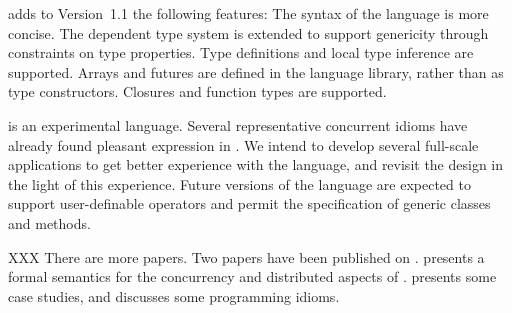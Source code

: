 {}\XtenCurrVer{} adds to Version~1.1 the following features:
The syntax of the language is more concise.
The dependent type system is extended to support genericity through
constraints on type properties.  Type definitions and local type inference are
supported.  Arrays and futures are defined in the language library, rather than
as type constructors.  Closures and function types are supported.

{}\Xten{} is an experimental language.  Several representative
concurrent idioms have already found pleasant expression in \Xten. We
intend to develop several full-scale applications to get better
experience with the language, and revisit the design in the light of
this experience. Future versions of the language are expected to
support user-definable operators and permit the specification of
generic classes and methods.

XXX There are more papers.
Two papers have been published on \Xten{}. \cite{X10-concur05}
presents a formal semantics for the concurrency and distributed
aspects of \Xten{}. \cite{xten} presents some case studies, and
discusses some \Xten{} programming idioms.
